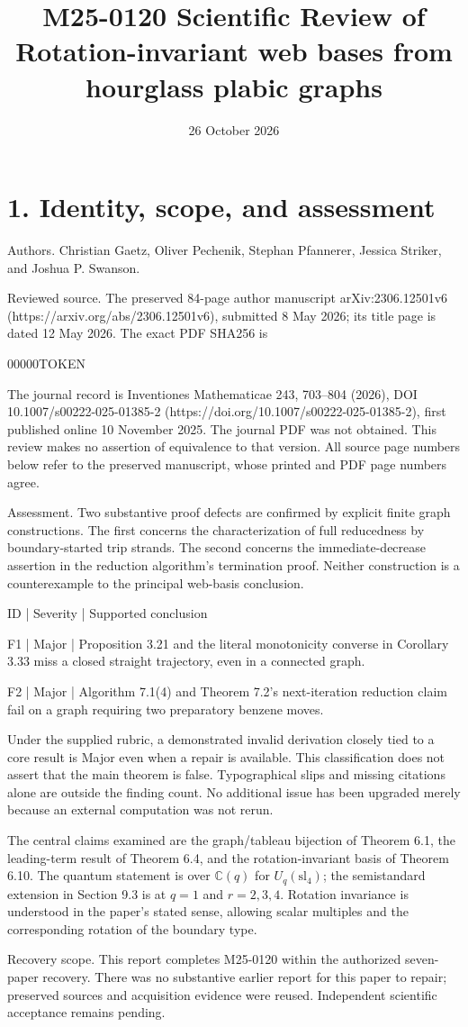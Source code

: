 \documentclass[10pt]{article}
\title{M25-0120
Scientific Review of
Rotation-invariant web bases from hourglass plabic graphs}
\author{}
\date{26 October 2026}
\begin{document}
\maketitle
\section*{1. Identity, scope, and assessment}
Authors. Christian Gaetz, Oliver Pechenik, Stephan Pfannerer, Jessica Striker, and Joshua P. Swanson.\par
Reviewed source. The preserved 84-page author manuscript arXiv:2306.12501v6 (https://arxiv.org/abs/2306.12501v6), submitted 8 May 2026; its title page is dated 12 May 2026. The exact PDF SHA256 is\par
00000TOKEN\par
The journal record is Inventiones Mathematicae 243, 703–804 (2026), DOI 10.1007/s00222-025-01385-2 (https://doi.org/10.1007/s00222-025-01385-2), first published online 10 November 2025. The journal PDF was not obtained. This review makes no assertion of equivalence to that version. All source page numbers below refer to the preserved manuscript, whose printed and PDF page numbers agree.\par
Assessment. Two substantive proof defects are confirmed by explicit finite graph constructions. The first concerns the characterization of full reducedness by boundary-started trip strands. The second concerns the immediate-decrease assertion in the reduction algorithm’s termination proof. Neither construction is a counterexample to the principal web-basis conclusion.\par
ID | Severity | Supported conclusion\par
F1 | Major | Proposition 3.21 and the literal monotonicity converse in Corollary 3.33 miss a closed straight trajectory, even in a connected graph.\par
F2 | Major | Algorithm 7.1(4) and Theorem 7.2’s next-iteration reduction claim fail on a graph requiring two preparatory benzene moves.\par
Under the supplied rubric, a demonstrated invalid derivation closely tied to a core result is Major even when a repair is available. This classification does not assert that the main theorem is false. Typographical slips and missing citations alone are outside the finding count. No additional issue has been upgraded merely because an external computation was not rerun.\par
The central claims examined are the graph/tableau bijection of Theorem 6.1, the leading-term result of Theorem 6.4, and the rotation-invariant basis of Theorem 6.10. The quantum statement is over \(\mathbb C(q)\) for \(U_q(\mathrm{sl}_4)\); the semistandard extension in Section 9.3 is at \(q=1\) and \(r=2,3,4\). Rotation invariance is understood in the paper’s stated sense, allowing scalar multiples and the corresponding rotation of the boundary type.\par
Recovery scope. This report completes M25-0120 within the authorized seven-paper recovery. There was no substantive earlier report for this paper to repair; preserved sources and acquisition evidence were reused. Independent scientific acceptance remains pending.\par
\end{document}
